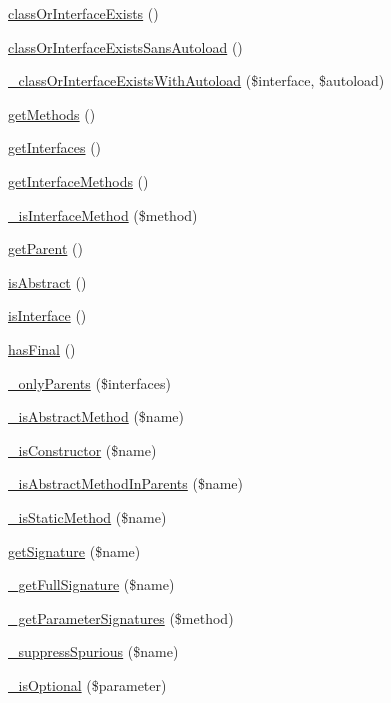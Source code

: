 \begin{DoxyCompactItemize}
\item 
\hyperlink{class_simple_reflection_af18aa4a7e354dcf43a5423b27a2a8760}{classOrInterfaceExists} ()
\item 
\hyperlink{class_simple_reflection_acea353e896b1cd11e7f11fc618297238}{classOrInterfaceExistsSansAutoload} ()
\item 
\hyperlink{class_simple_reflection_ac2d030d93a1d5169d886e2bfe878fa01}{\_\-classOrInterfaceExistsWithAutoload} (\$interface, \$autoload)
\item 
\hyperlink{class_simple_reflection_af595c3f6cffaa3c4c7d6993a65e59206}{getMethods} ()
\item 
\hyperlink{class_simple_reflection_a6ed9bfcb7b8dd94903537d783c536f17}{getInterfaces} ()
\item 
\hyperlink{class_simple_reflection_aacb55dfc402458422e376227aa54dd91}{getInterfaceMethods} ()
\item 
\hyperlink{class_simple_reflection_abd74b1744a218f103d5d96ad95ce6f13}{\_\-isInterfaceMethod} (\$method)
\item 
\hyperlink{class_simple_reflection_a365526e84d55ce7c97ab78c7770db46e}{getParent} ()
\item 
\hyperlink{class_simple_reflection_aed337e5d22f6ec345fc1b74e09852156}{isAbstract} ()
\item 
\hyperlink{class_simple_reflection_ae5838a6f80eb13ce9ffc1f935ff0768d}{isInterface} ()
\item 
\hyperlink{class_simple_reflection_a643ff5d07c0c1e6d24a6c7fad36da9af}{hasFinal} ()
\item 
\hyperlink{class_simple_reflection_ab619efb054cde5a01c7db7dece7884fa}{\_\-onlyParents} (\$interfaces)
\item 
\hyperlink{class_simple_reflection_a1fe2493b64709f4a14be03cd7726e07f}{\_\-isAbstractMethod} (\$name)
\item 
\hyperlink{class_simple_reflection_a338c5377bd72a61a5664f3e7cf73514c}{\_\-isConstructor} (\$name)
\item 
\hyperlink{class_simple_reflection_ac9006131842cb26ec294640918828191}{\_\-isAbstractMethodInParents} (\$name)
\item 
\hyperlink{class_simple_reflection_a87c6f5b63b2eecc642580e32660417ae}{\_\-isStaticMethod} (\$name)
\item 
\hyperlink{class_simple_reflection_a6145a1e4b2502359151d62f044b86f25}{getSignature} (\$name)
\item 
\hyperlink{class_simple_reflection_ab1cf79a333f164b0ddba43126b3f1c55}{\_\-getFullSignature} (\$name)
\item 
\hyperlink{class_simple_reflection_a491066d77b32606cfdb27a6afc8718f3}{\_\-getParameterSignatures} (\$method)
\item 
\hyperlink{class_simple_reflection_affdabe4bf112c447fbe6e1c9bae38ac3}{\_\-suppressSpurious} (\$name)
\item 
\hyperlink{class_simple_reflection_a819a499d68a179ddb1edcc0ecbfec02e}{\_\-isOptional} (\$parameter)
\end{DoxyCompactItemize}
